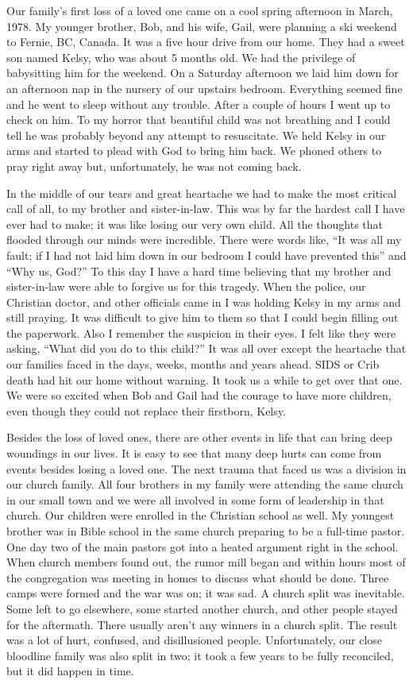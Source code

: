 \documentclass[twoside, 12pt]{book}
\begin{document}
Our family’s first loss of a loved one came on a cool spring afternoon in March, 1978. My  younger brother, Bob, and his wife, Gail, were planning a ski weekend to Fernie, BC, Canada. It was a five hour drive from our home. They had a sweet son named Kelsy, who was about 5 months old. We had the privilege of babysitting him for the weekend. On a Saturday afternoon we laid him down for an afternoon nap in the nursery of our upstairs bedroom. Everything seemed fine and he went to sleep without any trouble. After a couple of hours I went up to check on him. To my horror that beautiful child was not breathing and I could tell he was probably beyond any attempt to resuscitate. We held Kelsy in our arms and started to plead with God to bring him back. We phoned others to pray right away but, unfortunately, he was not coming back. 

In the middle of our tears and great heartache we had to make the most critical call of all, to my brother and sister-in-law. This was by far the hardest call I have ever had to make; it was like losing our very own child. All the thoughts that flooded through our minds were incredible. There were words like, “It was all my fault; if I had not laid him down in our bedroom I could have prevented this” and “Why us, God?” To this day I have a hard time believing that my brother and sister-in-law were able to forgive us for this tragedy. When the police, our Christian doctor, and other officials came in I was holding Kelsy in my arms and still praying. It was difficult to give him to them so that I could begin filling out the paperwork. Also I remember the suspicion in their eyes. I felt like they were asking, “What did you do to this child?” It was all over except the heartache that our families faced in the days, weeks, months and years ahead. SIDS or Crib death had hit our home without warning. It took us a while to get over that one. We were so excited when Bob and Gail had the courage to have more children, even though they could not replace their firstborn, Kelsy.

Besides the loss of loved ones, there are other events in life that can bring deep woundings in our lives. It is easy to see that many deep hurts can come from events besides losing a loved one. The next trauma that faced us was a division in our church family. All four brothers in my family were attending the same church in our small town and we were all involved in some form of leadership in that church. Our children were enrolled in the Christian school as well. My youngest brother was in Bible school in the same church preparing to be a full-time pastor. One day two of the main pastors got into a heated argument right in the school. When church members found out, the rumor mill began and within hours most of the congregation was meeting in homes to discuss what should be done. Three camps were formed and the war was on; it was sad. A church split was inevitable. Some left to go elsewhere, some started another church, and other people stayed for the aftermath. There usually aren't any winners in a church split. The result was a lot of hurt, confused, and disillusioned people. Unfortunately, our close bloodline family was also split in two; it took a few years to be fully reconciled, but it did happen in time. 
\end{document}
